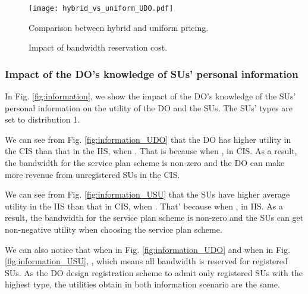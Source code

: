 \documentclass[journal]{IEEEtran}
\begin{document}
\begin{figure*}[tp]
\centering
\begin{minipage}{2.0in}
\centering
\texttt{[image: hybrid\_vs\_uniform\_UDO.pdf]}
\caption{Comparison between hybrid and uniform pricing.}
\label{fig:hybrid}
\end{minipage}
\hspace{1.2cm}
\begin{minipage}{4.0in}
\centering
{}\hspace{0.0cm}
\caption{Impact of bandwidth reservation cost.}
\label{fig:epsilon0-B_R}
\vspace{-0.0cm}
\end{minipage}
\end{figure*}

\subsubsection{Impact of the DO's knowledge of SUs' personal information}

In Fig. \ref{fig:information}, we show the impact of the DO's knowledge of the SUs' personal information on the utility of the DO and the SUs. The SUs' types are set to distribution 1.

We can see from Fig. \ref{fig:information_UDO} that the DO has higher utility in the CIS than that in the IIS, when . That is because when ,  in CIS. As a result, the bandwidth for the service plan scheme is non-zero and the DO can make more revenue from unregistered SUs in the CIS.

We can see from Fig. \ref{fig:information_USU} that the SUs have higher average utility in the IIS than that in CIS, when . That' because when ,  in IIS. As a result, the bandwidth for the service plan scheme is non-zero and the SUs can get non-negative utility when choosing the service plan scheme.

We can also notice that when  in Fig. \ref{fig:information_UDO} and when  in Fig. \ref{fig:information_USU}, , which means all bandwidth is reserved for registered SUs. As the DO design registration scheme to admit only registered SUs with the highest type, the utilities obtain in both information scenario are the same.
\end{document}
